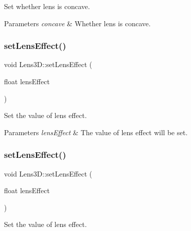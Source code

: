 Set whether lens is concave. 


\begin{DoxyParams}{Parameters}
{\em concave} & Whether lens is concave. \\
\hline
\end{DoxyParams}
\mbox{\label{classLens3D_abd9544a7f5363453a0b882b7e92eefdd}} 
\subsubsection{\texorpdfstring{set\+Lens\+Effect()}{setLensEffect()}\hspace{0.1cm}{\footnotesize\ttfamily [1/2]}}
{\footnotesize\ttfamily void Lens3\+D\+::set\+Lens\+Effect (\begin{DoxyParamCaption}\item[{float}]{lens\+Effect }\end{DoxyParamCaption})\hspace{0.3cm}{\ttfamily [inline]}}



Set the value of lens effect. 


\begin{DoxyParams}{Parameters}
{\em lens\+Effect} & The value of lens effect will be set. \\
\hline
\end{DoxyParams}
\mbox{\label{classLens3D_abd9544a7f5363453a0b882b7e92eefdd}} 
\subsubsection{\texorpdfstring{set\+Lens\+Effect()}{setLensEffect()}\hspace{0.1cm}{\footnotesize\ttfamily [2/2]}}
{\footnotesize\ttfamily void Lens3\+D\+::set\+Lens\+Effect (\begin{DoxyParamCaption}\item[{float}]{lens\+Effect }\end{DoxyParamCaption})\hspace{0.3cm}{\ttfamily [inline]}}



Set the value of lens effect. 


